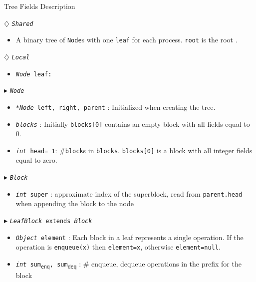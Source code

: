 \documentclass[10pt]{article}
\newcommand{\sub}[1]{\textsubscript{#1}}
\renewcommand{\tt}[1]{\texttt{#1}}
\renewcommand{\sl}[1]{\textsl{#1}}
\newcommand{\nf}[1]{{\normalfont{\texttt{#1}}}}
\newcommand{\head}{head}
\theoremstyle{definition}
\begin{document}
\begin{algorithm}
\caption{Tree Fields Description}
\begin{algorithmic}[1]
\setcounter{ALG@line}{100}
\begin{multicols}{2}

\Statex $\diamondsuit$ \tt{\sl{Shared}}
\begin{itemize}
\item \textsf{A binary tree of \tt{Node}s with one \tt{leaf} for each process. \tt{root} is the root \nf{node}.}
\end{itemize}

\Statex $\diamondsuit$ \tt{\sl{Local}}
\begin{itemize}
\item \tt{\sl{Node} leaf:} 
\end{itemize}

\Statex $\blacktriangleright$ \tt{\sl{Node}}
\begin{itemize}
\item \tt{\sl{*Node} left, right, parent} \textsf{: Initialized  when creating the tree.}
\item \tt{\sl{blocks}} \textsf{: Initially \tt{blocks[0]} contains an empty block with all fields equal to 0.}
\item \tt{\sl{int} \head= 1}\textsf{: \#\tt{block}s in \tt{blocks}. \tt{blocks[0]} is a block with all integer fields equal to zero.}
\end{itemize}

\Statex $\blacktriangleright$ \tt{\sl{Block}} 

\begin{itemize}
  \item \tt{\sl{int} super}
  \textsf{: approximate index of the superblock, read from \tt{parent.head} when appending the block to the node}
\end{itemize}

\Statex $\blacktriangleright$ \tt{\sl{LeafBlock} extends \sl{Block}}
\begin{itemize}
  \item \tt{\sl{Object} element}
  \textsf{: Each block in a leaf represents a single operation. If the operation is \tt{enqueue(x)} then \tt{element=x}, otherwise \tt{element=null}.}
  
    \item \tt{\sl{int} sum\sub{enq}, sum\sub{deq}}
  \textsf{: \# enqueue, dequeue operations in the prefix for the block}
  
\end{itemize}


\end{multicols}
\end{algorithmic}
\end{algorithm}
\end{document}
